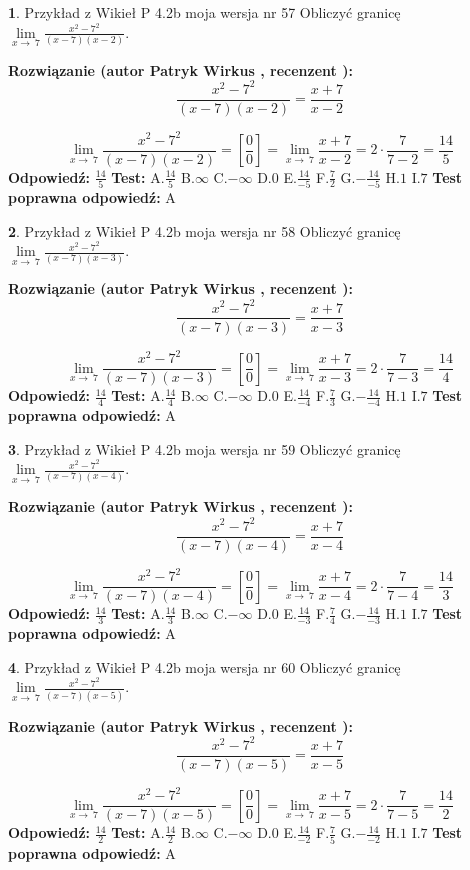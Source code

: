 \documentclass[12pt, a4paper]{article}
\theoremstyle{definition} %
\newtheorem{zad}{}
\newcommand{\zadStart}[1]{\begin{zad}#1\newline}
\newcommand{\zadStop}{\end{zad}}
\newcommand{\rozwStart}[2]{\noindent \textbf{Rozwiązanie (autor #1 , recenzent #2): }\newline}
\newcommand{\rozwStop}{\newline}
\newcommand{\odpStart}{\noindent \textbf{Odpowiedź:}\newline}
\newcommand{\odpStop}{\newline}
\newcommand{\testStart}{\noindent \textbf{Test:}\newline}
\newcommand{\testStop}{\newline}
\newcommand{\kluczStart}{\noindent \textbf{Test poprawna odpowiedź:}\newline}
\newcommand{\kluczStop}{\newline}
\begin{document}
\zadStart{Przykład z Wikieł P 4.2b moja wersja nr 57}
Obliczyć granicę $\lim\limits_{x\to\ 7}\frac{x^{2}-7^{2}}{(x-7)(x-2)}$.
\zadStop
\rozwStart{Patryk Wirkus}{}
$$\frac{x^{2}-7^{2}}{(x-7)(x-2)}=\frac{x+7}{x-2}$$

$$\lim\limits_{x\to\ 7}\frac{x^{2}-7^{2}}{(x-7)(x-2)}=[\frac{0}{0}]=\lim\limits_{x\to\ 7}\frac{x+7}{x-2}=2 \cdot \frac{7}{7-2} = \frac{14}{5}$$
\rozwStop
\odpStart
$\frac{14}{5}$
\odpStop
\testStart
A.$\frac{14}{5}$
B.$\infty$
C.$-\infty$
D.$0$
E.$\frac{14}{-5}$
F.$\frac{7}{2}$
G.$-\frac{14}{-5}$
H.$1$
I.$7$
\testStop
\kluczStart
A
\kluczStop



\zadStart{Przykład z Wikieł P 4.2b moja wersja nr 58}
Obliczyć granicę $\lim\limits_{x\to\ 7}\frac{x^{2}-7^{2}}{(x-7)(x-3)}$.
\zadStop
\rozwStart{Patryk Wirkus}{}
$$\frac{x^{2}-7^{2}}{(x-7)(x-3)}=\frac{x+7}{x-3}$$

$$\lim\limits_{x\to\ 7}\frac{x^{2}-7^{2}}{(x-7)(x-3)}=[\frac{0}{0}]=\lim\limits_{x\to\ 7}\frac{x+7}{x-3}=2 \cdot \frac{7}{7-3} = \frac{14}{4}$$
\rozwStop
\odpStart
$\frac{14}{4}$
\odpStop
\testStart
A.$\frac{14}{4}$
B.$\infty$
C.$-\infty$
D.$0$
E.$\frac{14}{-4}$
F.$\frac{7}{3}$
G.$-\frac{14}{-4}$
H.$1$
I.$7$
\testStop
\kluczStart
A
\kluczStop



\zadStart{Przykład z Wikieł P 4.2b moja wersja nr 59}
Obliczyć granicę $\lim\limits_{x\to\ 7}\frac{x^{2}-7^{2}}{(x-7)(x-4)}$.
\zadStop
\rozwStart{Patryk Wirkus}{}
$$\frac{x^{2}-7^{2}}{(x-7)(x-4)}=\frac{x+7}{x-4}$$

$$\lim\limits_{x\to\ 7}\frac{x^{2}-7^{2}}{(x-7)(x-4)}=[\frac{0}{0}]=\lim\limits_{x\to\ 7}\frac{x+7}{x-4}=2 \cdot \frac{7}{7-4} = \frac{14}{3}$$
\rozwStop
\odpStart
$\frac{14}{3}$
\odpStop
\testStart
A.$\frac{14}{3}$
B.$\infty$
C.$-\infty$
D.$0$
E.$\frac{14}{-3}$
F.$\frac{7}{4}$
G.$-\frac{14}{-3}$
H.$1$
I.$7$
\testStop
\kluczStart
A
\kluczStop



\zadStart{Przykład z Wikieł P 4.2b moja wersja nr 60}
Obliczyć granicę $\lim\limits_{x\to\ 7}\frac{x^{2}-7^{2}}{(x-7)(x-5)}$.
\zadStop
\rozwStart{Patryk Wirkus}{}
$$\frac{x^{2}-7^{2}}{(x-7)(x-5)}=\frac{x+7}{x-5}$$

$$\lim\limits_{x\to\ 7}\frac{x^{2}-7^{2}}{(x-7)(x-5)}=[\frac{0}{0}]=\lim\limits_{x\to\ 7}\frac{x+7}{x-5}=2 \cdot \frac{7}{7-5} = \frac{14}{2}$$
\rozwStop
\odpStart
$\frac{14}{2}$
\odpStop
\testStart
A.$\frac{14}{2}$
B.$\infty$
C.$-\infty$
D.$0$
E.$\frac{14}{-2}$
F.$\frac{7}{5}$
G.$-\frac{14}{-2}$
H.$1$
I.$7$
\testStop
\kluczStart
A
\kluczStop
\end{document}
